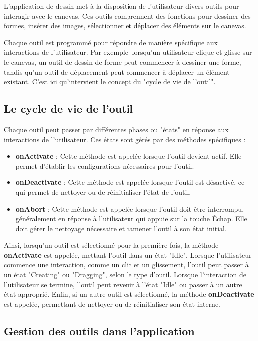 L'application de dessin met à la disposition de l'utilisateur divers outils pour interagir avec le canevas. Ces outils comprennent des fonctions pour dessiner des formes, insérer des images, sélectionner et déplacer des éléments sur le canevas.

Chaque outil est programmé pour répondre de manière spécifique aux interactions de l'utilisateur. Par exemple, lorsqu'un utilisateur clique et glisse sur le canevas, un outil de dessin de forme peut commencer à dessiner une forme, tandis qu'un outil de déplacement peut commencer à déplacer un élément existant. C'est ici qu'intervient le concept du "cycle de vie de l'outil".

\subsection{Le cycle de vie de l'outil}

Chaque outil peut passer par différentes phases ou "états" en réponse aux interactions de l'utilisateur. Ces états sont gérés par des méthodes spécifiques :

\begin{itemize}
    \item \textbf{onActivate} : Cette méthode est appelée lorsque l'outil devient actif. Elle permet d'établir les configurations nécessaires pour l'outil.
    \item \textbf{onDeactivate} : Cette méthode est appelée lorsque l'outil est désactivé, ce qui permet de nettoyer ou de réinitialiser l'état de l'outil.
    \item \textbf{onAbort} : Cette méthode est appelée lorsque l'outil doit être interrompu, généralement en réponse à l'utilisateur qui appuie sur la touche Échap. Elle doit gérer le nettoyage nécessaire et ramener l'outil à son état initial.
\end{itemize}

Ainsi, lorsqu'un outil est sélectionné pour la première fois, la méthode \textbf{onActivate} est appelée, mettant l'outil dans un état "Idle". Lorsque l'utilisateur commence une interaction, comme un clic et un glissement, l'outil peut passer à un état "Creating" ou "Dragging", selon le type d'outil. Lorsque l'interaction de l'utilisateur se termine, l'outil peut revenir à l'état "Idle" ou passer à un autre état approprié. Enfin, si un autre outil est sélectionné, la méthode \textbf{onDeactivate} est appelée, permettant de nettoyer ou de réinitialiser son état interne.

\subsection{Gestion des outils dans l'application}

